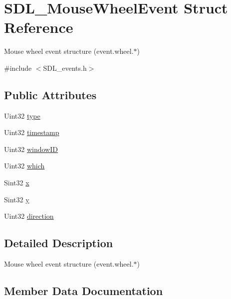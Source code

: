 \hypertarget{structSDL__MouseWheelEvent}{}\section{S\+D\+L\+\_\+\+Mouse\+Wheel\+Event Struct Reference}
\label{structSDL__MouseWheelEvent}


Mouse wheel event structure (event.\+wheel.$\ast$)  




{\ttfamily \#include $<$S\+D\+L\+\_\+events.\+h$>$}

\subsection*{Public Attributes}
\begin{DoxyCompactItemize}
\item 
Uint32 \hyperlink{structSDL__MouseWheelEvent_aa6b741e99df708c6f9550ee0f520fb70}{type}
\item 
Uint32 \hyperlink{structSDL__MouseWheelEvent_a83ad52c80ff49a8e75dc6c33bba65fa0}{timestamp}
\item 
Uint32 \hyperlink{structSDL__MouseWheelEvent_ab45eb1895217214ecb773fc555e08f6c}{window\+ID}
\item 
Uint32 \hyperlink{structSDL__MouseWheelEvent_a014dc767d52e8b75ba26a5f12e1704e8}{which}
\item 
Sint32 \hyperlink{structSDL__MouseWheelEvent_a6d904eef474ea45a5b1828fcb5b0f859}{x}
\item 
Sint32 \hyperlink{structSDL__MouseWheelEvent_a53fdf77a464426bc8b30e629795f044b}{y}
\item 
Uint32 \hyperlink{structSDL__MouseWheelEvent_a9fc46552d116499e5b8ca89d66df932c}{direction}
\end{DoxyCompactItemize}


\subsection{Detailed Description}
Mouse wheel event structure (event.\+wheel.$\ast$) 

\subsection{Member Data Documentation}
\mbox{\label{structSDL__MouseWheelEvent_a9fc46552d116499e5b8ca89d66df932c}} 

